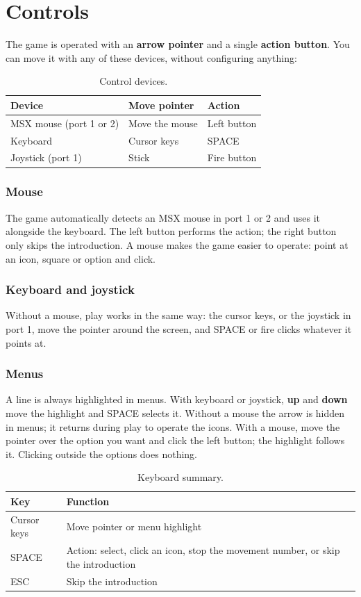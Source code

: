 \chapter{Controls}\label{cap:controles}
The game is operated with an \textbf{arrow pointer} and a single \textbf{action button}. You can move it with any of these devices, without configuring anything:
\begin{table}[H]\centering\small
\begin{tabularx}{\linewidth}{@{}lLL@{}}
\toprule\textbf{Device} & \textbf{Move pointer} & \textbf{Action}\\\midrule
MSX mouse (port 1 or 2) & Move the mouse & Left button\\
Keyboard & Cursor keys & SPACE\\
Joystick (port 1) & Stick & Fire button\\\bottomrule
\end{tabularx}\caption{Control devices.}\end{table}
\subsection{Mouse}
The game automatically detects an MSX mouse in port 1 or 2 and uses it alongside the keyboard. The left button performs the action; the right button only skips the introduction. A mouse makes the game easier to operate: point at an icon, square or option and click.
\subsection{Keyboard and joystick}
Without a mouse, play works in the same way: the cursor keys, or the joystick in port 1, move the pointer around the screen, and SPACE or fire clicks whatever it points at.
\subsection{Menus}
A line is always highlighted in menus. With keyboard or joystick, \textbf{up} and \textbf{down} move the highlight and SPACE selects it. Without a mouse the arrow is hidden in menus; it returns during play to operate the icons. With a mouse, move the pointer over the option you want and click the left button; the highlight follows it. Clicking outside the options does nothing.
\begin{table}[H]\centering\small
\begin{tabularx}{\linewidth}{@{}lL@{}}
\toprule\textbf{Key} & \textbf{Function}\\\midrule
Cursor keys & Move pointer or menu highlight\\
SPACE & Action: select, click an icon, stop the movement number, or skip the introduction\\
ESC & Skip the introduction\\\bottomrule
\end{tabularx}\caption{Keyboard summary.}\end{table}
